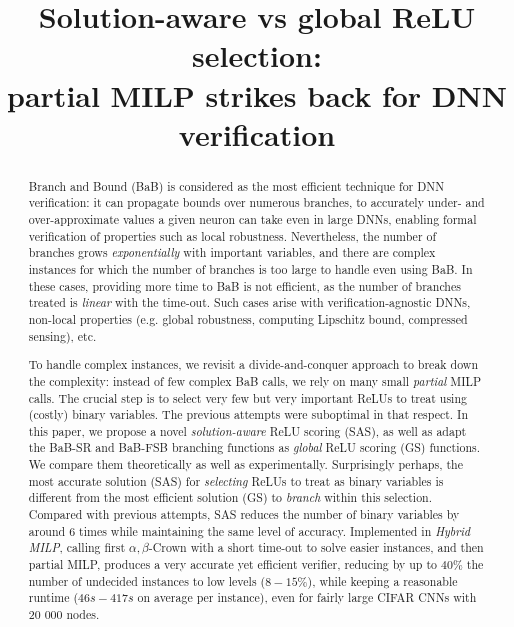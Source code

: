 \documentclass{llncs}
\title{Solution-aware vs global ReLU selection: \\
partial MILP strikes back for DNN verification}
\date{}
\begin{document}
	
	\maketitle
	
	\begin{abstract}
		Branch and Bound (BaB) is considered as the most efficient technique for DNN verification: it can propagate bounds over numerous branches, to accurately under- and over-approximate values a given neuron can take even in large DNNs, enabling formal verification of properties such as local robustness. Nevertheless, the number of branches grows {\em exponentially} with important variables, and there are complex instances for which the number of branches is too large to handle even using BaB. In these cases, providing more time to BaB is not efficient, as the number of branches treated is {\em linear} with the time-out. Such cases arise with verification-agnostic DNNs, non-local properties (e.g. global robustness, computing Lipschitz bound, compressed sensing), etc. 
				
        To handle complex instances, we revisit a divide-and-conquer approach to break down the complexity: instead of few complex BaB calls, we rely on many small {\em partial} MILP calls. The crucial step is to select very few but very important ReLUs to treat using (costly) binary variables. The previous attempts were suboptimal in that respect. In this paper, we propose a novel {\em solution-aware} ReLU scoring (SAS), as well as adapt the BaB-SR and BaB-FSB branching functions as {\em global} ReLU scoring (GS) functions. We compare them theoretically as well as experimentally. Surprisingly perhaps, the most accurate solution (SAS) for {\em selecting} ReLUs to treat as binary variables is different from the most efficient solution (GS) to {\em branch} within this selection. Compared with previous attempts, SAS reduces the number of binary variables by around 6 times while maintaining the same level of accuracy. Implemented in {\em Hybrid MILP}, calling first $\alpha,\beta$-Crown with a short time-out to solve easier instances, and then partial MILP, produces a very accurate yet efficient verifier, reducing by up to $40\%$ the number of undecided instances to low levels ($8-15\%$), while keeping a reasonable runtime ($46s-417s$ on average per instance), even for fairly large CIFAR CNNs with 20 000 nodes.


\end{abstract}
\end{document}
